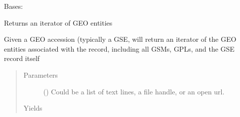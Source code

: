 \documentclass[letterpaper,10pt,english]{sphinxmanual}
\begin{document}

\begin{fulllineitems}
\label{\detokenize{omicidx.geometa:omicidx.geometa.GEOSeries}}
Bases: {\hyperref[\detokenize{omicidx.geometa:omicidx.geometa.GEOEnitity}]{}}

\end{fulllineitems}


\begin{fulllineitems}
\label{\detokenize{omicidx.geometa:omicidx.geometa.geo_soft_entity_iterator}}
Returns an iterator of GEO entities

Given a GEO accession (typically a GSE,
will return an iterator of the GEO entities
associated with the record, including all
GSMs, GPLs, and the GSE record itself
\begin{quote}\begin{description}
\item[{Parameters}] \leavevmode
{} () \textendash{} Could be a list of text lines, a file handle, or
an open url.

\item[{Yields}] \leavevmode
{}

\end{description}\end{quote}

\begin{sphinxVerbatim}[commandchars=\\\{\}]
   
    
\end{sphinxVerbatim}

\end{fulllineitems}
\end{document}
